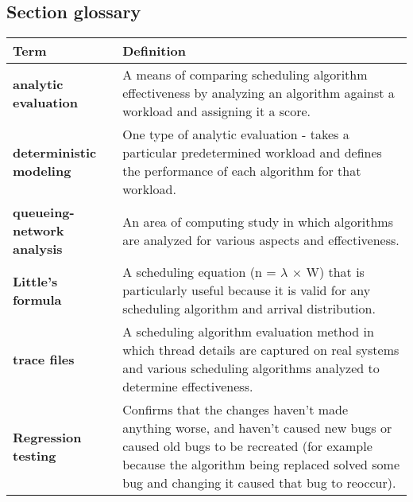 \subsection*{Section glossary}
\centering
\begin{tabular}{>{\raggedright}p{} >{\raggedright\arraybackslash}p{}}
\toprule
\textbf{Term} & \textbf{Definition} \\
\midrule
\textbf{analytic evaluation} & A means of comparing scheduling algorithm effectiveness by analyzing an algorithm against a workload and assigning it a score. \\
\textbf{deterministic modeling} & One type of analytic evaluation - takes a particular predetermined workload and defines the performance of each algorithm for that workload. \\
\textbf{queueing-network analysis} & An area of computing study in which algorithms are analyzed for various aspects and effectiveness. \\
\textbf{Little's formula} & A scheduling equation (n = $\lambda$ $\times$ W) that is particularly useful because it is valid for any scheduling algorithm and arrival distribution. \\
\textbf{trace files} & A scheduling algorithm evaluation method in which thread details are captured on real systems and various scheduling algorithms analyzed to determine effectiveness. \\
\textbf{Regression testing} & Confirms that the changes haven't made anything worse, and haven't caused new bugs or caused old bugs to be recreated (for example because the algorithm being replaced solved some bug and changing it caused that bug to reoccur). \\
\bottomrule
\end{tabular}
\vspace{\baselineskip}

